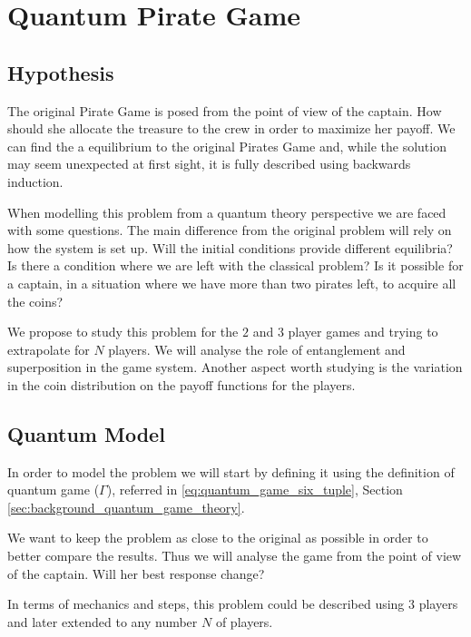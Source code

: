 \section{Quantum Pirate Game}
\label{sec:quantum_pirate}

\subsection{Hypothesis}
\label{subsec:qhipothesis}

The original Pirate Game is posed from the point of view of the captain. How should she allocate the treasure to the crew in order to maximize her payoff.
We can find the a equilibrium to the original Pirates Game and, while the solution may seem unexpected at first sight, it is fully described using backwards induction. 

When modelling this problem from a quantum theory perspective we are faced with some questions. The main difference from the original problem will rely on how the system is set up. Will the initial conditions provide different equilibria? Is there a condition where we are left with the classical problem? Is it possible for a captain, in a situation where we have more than two pirates left, to acquire all the coins?

We propose to study this problem for the $2$ and $3$ player games and trying to extrapolate for $N$ players. We will analyse the role of entanglement and superposition in the game system. Another aspect worth studying is the variation in the coin distribution on the payoff functions for the players.



\subsection{Quantum Model}
\label{subsec:description_2}

In order to model the problem we will start by defining it using the definition of quantum game ($\Gamma$), referred in \ref{eq:quantum_game_six_tuple}, Section \ref{sec:background_quantum_game_theory}\cite{Fra2011a}.

We want to keep the problem as close to the original as possible in order to better compare the results. Thus we will analyse the game from the point of view of the captain. Will her best response change?

In terms of mechanics and steps, this problem could be described using $3$ players and later extended to any number $N$ of players. 

